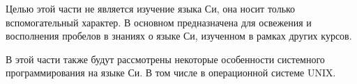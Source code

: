 Целью этой части не является изучение языка Си, она носит только вспомогательный характер. В основном предназначена для освежения и восполнения пробелов в знаниях о языке Си, изученном в рамках других курсов.

В этой части также будут рассмотрены некоторые особенности системного программирования на языке Си. В том числе в операционной системе UNIX.
